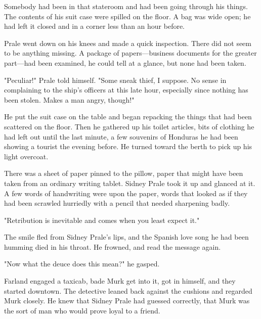 \documentclass{novel}
\begin{document}
Somebody had been in that stateroom and had been going through his things. The contents of his suit case were spilled on the floor. A bag was wide open; he had left it closed and in a corner less than an hour before.

Prale went down on his knees and made a quick inspection. There did not seem to be anything missing. A package of papers---business documents for the greater part---had been examined, he could tell at a glance, but none had been taken.

"Peculiar!" Prale told himself. "Some sneak thief, I suppose. No sense in complaining to the ship's officers at this late hour, especially since nothing has been stolen. Makes a man angry, though!"

He put the suit case on the table and began repacking the things that had been scattered on the floor. Then he gathered up his toilet articles, bits of clothing he had left out until the last minute, a few souvenirs of Honduras he had been showing a tourist the evening before. He turned toward the berth to pick up his light overcoat.

There was a sheet of paper pinned to the pillow, paper that might have been taken from an ordinary writing tablet. Sidney Prale took it up and glanced at it. A few words of handwriting were upon the paper, words that looked as if they had been scrawled hurriedly with a pencil that needed sharpening badly.

"Retribution is inevitable and comes when you least expect it."

The smile fled from Sidney Prale's lips, and the Spanish love song he had been humming died in his throat. He frowned, and read the message again.

"Now what the deuce does this mean?" he gasped.

\vspace{2\nbs}
\clearpage
\thispagestyle{empty}

\begin{ChapterStart}
\vspace{3\nbs}
\end{ChapterStart}
    
Farland engaged a taxicab, bade Murk get into it, got in himself, and they started downtown. The detective leaned back against the cushions and regarded Murk closely. He knew that Sidney Prale had guessed correctly, that Murk was the sort of man who would prove loyal to a friend.
\end{document}
